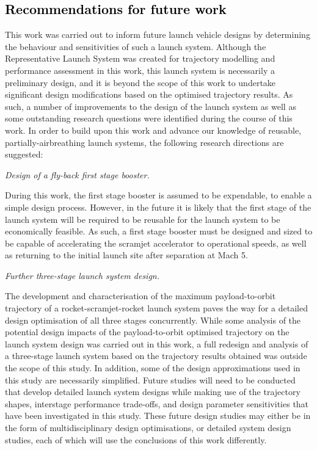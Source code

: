 \textcolor{black}{
  \chapter{Recommendations for future work}
}
\noindent  	
 This work was carried out to inform future launch vehicle designs by determining the behaviour and sensitivities of such a launch system. 
  Although the Representative Launch System was created for trajectory modelling and performance assessment in this work, this launch system is necessarily a preliminary design, and it is beyond the scope of this work to undertake significant design modifications based on the optimised trajectory results.
 As such, a number of improvements to the design of the launch system as well as some outstanding research questions were identified during the course of this work.
 In order to build upon this work and advance our knowledge of reusable, partially-airbreathing launch systems, the following research directions are suggested:


\vspace{10pt}
 \textit{Design of a fly-back first stage booster.}
 
 \noindent
 During this work, the first stage booster is assumed to be expendable, to enable a simple design process. However, in the future it is likely that the first stage of the launch system will be required to be reusable for the launch system to be economically feasible. As such, a first stage booster must be designed and sized to be capable of accelerating the scramjet accelerator to operational speeds, as well as returning to the initial launch site after separation at Mach 5. 

\vspace{10pt}
	\textit{Further three-stage launch system design.}

\noindent
The development and characterisation of the maximum payload-to-orbit trajectory of a rocket-scramjet-rocket launch system paves the way for a detailed design optimisation of all three stages concurrently.
While some analysis of the potential design impacts of the payload-to-orbit optimised trajectory on the launch system design was carried out in this work, a full redesign and analysis of a three-stage launch system based on the trajectory results obtained was outside the scope of this study. In addition, some of the design approximations used in this study are necessarily simplified. Future studies will need to be conducted that develop detailed launch system designs while making use of the trajectory shapes, interstage performance trade-offs, and design parameter sensitivities that have been investigated in this study. These future design studies may either be in the form of multidisciplinary design optimisations, or detailed system design studies, each of which will use the conclusions of this work differently. 

